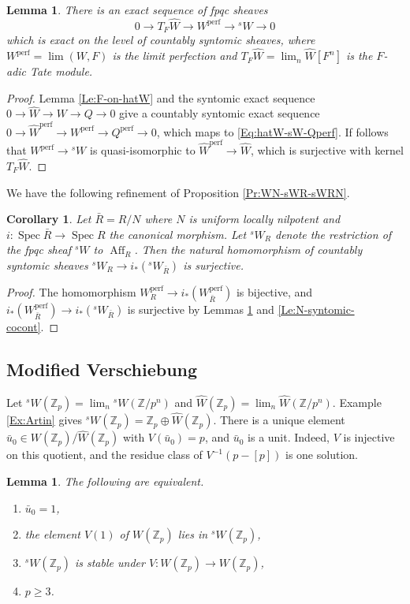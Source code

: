 \documentclass[a4paper,11pt]{amsart}
\theoremstyle{plain}
\newtheorem{Lemma}[equation]{Lemma}
\newtheorem{Cor}[equation]{Corollary}
\theoremstyle{definition}
\theoremstyle{remark}
\newcommand{\bLe}{\begin{Lemma}}
\newcommand{\eLe}{\end{Lemma}}
\newcommand{\bCo}{\begin{Cor}}
\newcommand{\eCo}{\end{Cor}}
\newcommand{\bproof}{\begin{proof}}
\newcommand{\eproof}{\end{proof}}
\newcommand{\beqn}{\begin{equation}}
\newcommand{\eeqn}{\end{equation}}
\numberwithin{equation}{section}
\newcommand{\ZZ}{{\mathbb{Z}}}
\DeclareMathOperator{\perf}{perf}
\DeclareMathOperator{\Aff}{Aff}
\DeclareMathOperator{\Spec}{Spec}
\newcommand{\limperf}{^{\perf}}
\newcommand{\sW}{{}^sW}
\begin{document}
\bLe
\label{Le:TFhW-Wperf-sW}
There is an exact sequence of fpqc sheaves
\beqn
0\to T_F\hat W\to W\limperf\to\sW\to 0
\eeqn
which is exact on the level of countably syntomic sheaves, 
where 
$W\limperf=\lim(W,F)$ is the limit perfection and $T_F\hat W=\lim_n\hat W[F^n]$ is the $F$-adic Tate module.
\eLe

\bproof
Lemma \ref{Le:F-on-hatW} and the syntomic exact sequence $0\to\hat W\to W\to Q\to 0$ give a countably syntomic exact sequence 
$0\to\hat W\limperf\to W\limperf\to Q\limperf\to 0$,
which maps to \eqref{Eq:hatW-sW-Qperf}. If follows that $W\limperf\to\sW$ is quasi-isomorphic to $\hat W\limperf\to\hat W$, which is surjective with kernel $T_F\hat W$.
\eproof

We have the following refinement of Proposition \ref{Pr:WN-sWR-sWRN}.

\bCo
\label{Co:sWR-sWR/N-Nsynt}
Let $\bar R=R/N$ where $N$ is uniform locally nilpotent and $i\colon\Spec\bar R\to\Spec R$ the canonical morphism. Let $\sW_R$ denote the restriction of the fpqc sheaf $\sW$ to $\Aff_R$. Then the natural homomorphism of countably syntomic sheaves $\sW_R\to i_*(\sW_{\bar R})$ is surjective.
\eCo

\bproof
The homomorphism $W_{R}\limperf\to i_*(W_{\bar R}\limperf)$ is bijective, and $i_*(W_{\bar R}\limperf)\to i_*(\sW_{\bar R})$ is surjective by Lemmas \ref{Le:TFhW-Wperf-sW} and \ref{Le:N-syntomic-cocont}.
\eproof

\subsection{Modified Verschiebung}
\label{Se:modif-V}

Let $\sW(\ZZ_p)=\lim_n\sW(\ZZ/p^n)$ and $\hat W(\ZZ_p)=\lim_n\hat W(\ZZ/p^n)$. Example \ref{Ex:Artin} gives $\sW(\ZZ_p)=\ZZ_p\oplus\hat W(\ZZ_p)$.
There is a unique element $\bar u_0\in W(\ZZ_p)/\hat W(\ZZ_p)$ with $V(\bar u_0)=p$, and $\bar u_0$ is a unit. Indeed, $V$ is injective on this quotient, and the residue class of $V^{-1}(p-[p])$ is one solution. 

\bLe 
\label{Le:u0}
The following are equivalent. 
\begin{enumerate}
\item
\label{It:u0-1}
$\bar u_0=1$, 
\item 
\label{It:u0-2}
the element $V(1)$ of $W(\ZZ_p)$ lies in $\sW(\ZZ_p)$,
\item
\label{It:u0-3}
$\sW(\ZZ_p)$ is stable under $V\colon W(\ZZ_p)\to W(\ZZ_p)$,
\item
\label{It:u0-4}
$p\ge 3$.
\end{enumerate}
\eLe
\end{document}

